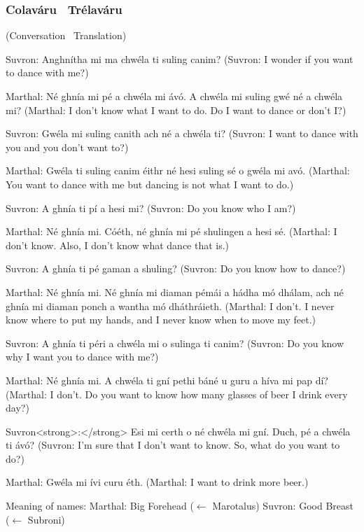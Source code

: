 \subsubsection{Colav\'{a}ru \textendash\ Tr\'{e}lav\'{a}ru}
(Conversation \textendash\ Translation)

Suvron: Anghn\'{i}tha mi ma chw\'{e}la ti suling canim?
(Suvron: I wonder if you want to dance with me?)

Marthal: N\'{e} ghn\'{i}a mi p\'{e} a chw\'{e}la mi \'{a}v\'{o}. A chw\'{e}la mi suling gw\'{e} n\'{e} a chw\'{e}la mi?
(Marthal: I don't know what I want to do. Do I want to dance or don't I?)

Suvron: Gw\'{e}la mi suling canith ach n\'{e} a chw\'{e}la ti?
(Suvron: I want to dance with you and you don't want to?)

Marthal: Gw\'{e}la ti suling canim \'{e}ithr n\'{e} hesi suling s\'{e} o gw\'{e}la mi av\'{o}.
(Marthal: You want to dance with me but dancing is not what I want to do.)

Suvron: A ghn\'{i}a ti p\'{i} a hesi mi?
(Suvron: Do you know who I am?)

Marthal: N\'{e} ghn\'{i}a mi. C\'{o}\'{e}th, n\'{e} ghn\'{i}a mi p\'{e} shulingen a hesi s\'{e}.
(Marthal: I don't know. Also, I don't know what dance that is.)

Suvron: A ghn\'{i}a ti p\'{e} gaman a shuling?
(Suvron: Do you know how to dance?)

Marthal: N\'{e} ghn\'{i}a mi. N\'{e} ghn\'{i}a mi diaman p\'{e}m\'{a}i a h\'{a}dha m\'{o} dh\'{a}lam, ach n\'{e} ghn\'{i}a mi diaman ponch a wantha m\'{o} dh\'{a}thr\'{a}ieth.
(Marthal: I don't. I never know where to put my hands, and I never know when to move my feet.)

Suvron: A ghn\'{i}a ti p\'{e}ri a chw\'{e}la mi o sulinga ti canim?
(Suvron: Do you know why I want you to dance with me?)

Marthal: N\'{e} ghn\'{i}a mi. A chw\'{e}la ti gn\'{i} pethi b\'{a}n\'{e} u guru a h\'{i}va mi pap d\'{i}?
(Marthal: I don't. Do you want to know how many glasses of beer I drink every day?)

Suvron<strong>:</strong> Esi mi certh o n\'{e} chw\'{e}la mi gn\'{i}. Duch, p\'{e} a chw\'{e}la ti \'{a}v\'{o}?
(Suvron: I'm sure that I don't want to know. So, what do you want to do?)

Marthal: Gw\'{e}la mi \'{i}vi curu \'{e}th.
(Marthal: I want to drink more beer.)

Meaning of names:
Marthal: Big Forehead ($\leftarrow$ Marotalus)
Suvron: Good Breast ($\leftarrow$ Subroni)

